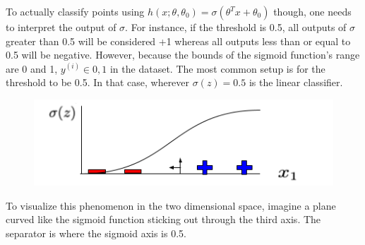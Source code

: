 \documentclass{article}
\begin{document}
    To actually classify points using $h(x; \theta, \theta_0)=\sigma(\theta^Tx+\theta_0)$ though, one needs to interpret the output of $\sigma$. For instance, if the threshold is 0.5, all outputs of $\sigma$ greater than 0.5 will be considered +1 whereas all outputs less than or equal to 0.5 will be negative. However, because the bounds of the sigmoid function's range are 0 and 1, $y^{(i)}\in{0,1}$ in the dataset. The most common setup is for the threshold to be 0.5. In that case, wherever $\sigma(z)=0.5$ is the linear classifier. 

    \begin{figure}[H]
        \centering
        \includegraphics[width=0.5\linewidth]{Classifier Using Sigmoid Function.png}
    \end{figure}

    To visualize this phenomenon in the two dimensional space, imagine a plane curved like the sigmoid function sticking out through the third axis. The separator is where the sigmoid axis is 0.5. 
\end{document}
